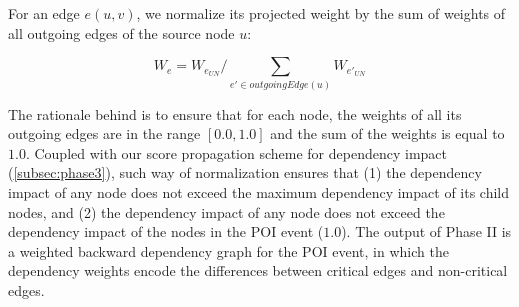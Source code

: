 For an edge $e(u, v)$, we normalize its projected weight by the sum of weights of all outgoing edges of the source node $u$:

\begin{equation}
    \label{eq:local-weight-normalization}
    W_e = W_{e_{UN}}/\sum_{e' \in outgoingEdge(u)} W_{e'_{UN}}
\end{equation}

The rationale behind is to ensure that for each node, the weights of all its outgoing edges are in the range $[0.0, 1.0]$ and the sum of the weights is equal to $1.0$.
%
Coupled with our score propagation scheme for dependency impact (\cref{subsec:phase3}), such way of normalization ensures that (1) the dependency impact of any node does not exceed the maximum dependency impact of its child nodes, and (2) the dependency impact of any node does not exceed the dependency impact of the nodes in the POI event (\ie $1.0$).
%
The output of Phase II is a weighted backward dependency graph for the POI event, in which the dependency weights encode the differences between critical edges and non-critical edges.




